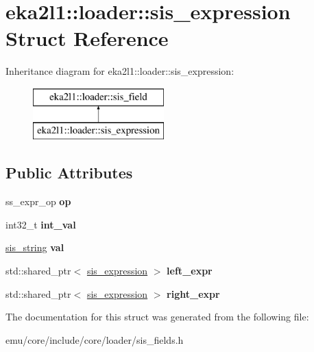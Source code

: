 \hypertarget{structeka2l1_1_1loader_1_1sis__expression}{}\section{eka2l1\+:\+:loader\+:\+:sis\+\_\+expression Struct Reference}
\label{structeka2l1_1_1loader_1_1sis__expression}
Inheritance diagram for eka2l1\+:\+:loader\+:\+:sis\+\_\+expression\+:\begin{figure}[H]
\begin{center}
\leavevmode
\includegraphics[height=2.000000cm]{structeka2l1_1_1loader_1_1sis__expression}
\end{center}
\end{figure}
\subsection*{Public Attributes}
\begin{DoxyCompactItemize}
\item 
\mbox{\label{structeka2l1_1_1loader_1_1sis__expression_a5c0e5f1d628dbfc2ef0ed80953fd510e}} 
ss\+\_\+expr\+\_\+op {\bfseries op}
\item 
\mbox{\label{structeka2l1_1_1loader_1_1sis__expression_a8f3eef37aca117e234e27180491ccbc2}} 
int32\+\_\+t {\bfseries int\+\_\+val}
\item 
\mbox{\label{structeka2l1_1_1loader_1_1sis__expression_a771bdca29a773197bac75f7dcd93ef98}} 
\mbox{\hyperlink{structeka2l1_1_1loader_1_1sis__string}{sis\+\_\+string}} {\bfseries val}
\item 
\mbox{\label{structeka2l1_1_1loader_1_1sis__expression_acf19a3fd5e814eec7fa743912ed50699}} 
std\+::shared\+\_\+ptr$<$ \mbox{\hyperlink{structeka2l1_1_1loader_1_1sis__expression}{sis\+\_\+expression}} $>$ {\bfseries left\+\_\+expr}
\item 
\mbox{\label{structeka2l1_1_1loader_1_1sis__expression_a41e08f3bc0a4ff8e17e6f39b632f88ad}} 
std\+::shared\+\_\+ptr$<$ \mbox{\hyperlink{structeka2l1_1_1loader_1_1sis__expression}{sis\+\_\+expression}} $>$ {\bfseries right\+\_\+expr}
\end{DoxyCompactItemize}


The documentation for this struct was generated from the following file\+:\begin{DoxyCompactItemize}
\item 
emu/core/include/core/loader/sis\+\_\+fields.\+h\end{DoxyCompactItemize}
